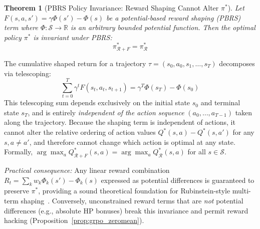 \documentclass[journal,10pt,twocolumn]{IEEEtran}
\newtheorem{theorem}{Theorem}
\begin{document}
\begin{theorem}[PBRS Policy Invariance: Reward Shaping Cannot Alter $\pi^*$]
\label{thm:pbrs_invariance}
Let $F(s, a, s') = \gamma \Phi(s') - \Phi(s)$ be a potential-based reward shaping (PBRS) term where $\Phi : \mathcal{S} \to \mathbb{R}$ is an arbitrary bounded potential function. Then the optimal policy $\pi^*$ is invariant under PBRS:
\begin{equation}
\pi^*_{\mathcal{R} + F} = \pi^*_{\mathcal{R}}
\end{equation}
\end{theorem}
\begin{IEEEproof}
The cumulative shaped return for a trajectory $\tau = (s_0, a_0, s_1, \dots, s_T)$ decomposes via telescoping:
\begin{equation}
\sum_{t=0}^{T} \gamma^t F(s_t, a_t, s_{t+1}) = \gamma^T \Phi(s_T) - \Phi(s_0)
\end{equation}
This telescoping sum depends exclusively on the initial state $s_0$ and terminal state $s_T$, and is entirely \emph{independent of the action sequence} $(a_0, \dots, a_{T-1})$ taken along the trajectory. Because the shaping term is independent of actions, it cannot alter the relative ordering of action values $Q^*(s, a) - Q^*(s, a')$ for any $s, a \neq a'$, and therefore cannot change which action is optimal at any state. Formally, $\arg\max_a Q^*_{\mathcal{R}+F}(s,a) = \arg\max_a Q^*_{\mathcal{R}}(s,a)$ for all $s \in \mathcal{S}$.

\textit{Practical consequence:} Any linear reward combination $R_t = \sum_k w_k \Phi_k(s') - \Phi_k(s)$ expressed as potential differences is guaranteed to preserve $\pi^*$, providing a sound theoretical foundation for Rubinstein-style multi-term shaping~\cite{rubinstein2025puffer,ng1999shaping}. Conversely, unconstrained reward terms that are \emph{not} potential differences (e.g., absolute HP bonuses) break this invariance and permit reward hacking (Proposition~\ref{prop:grpo_zeromean}).
\end{IEEEproof}
\end{document}
